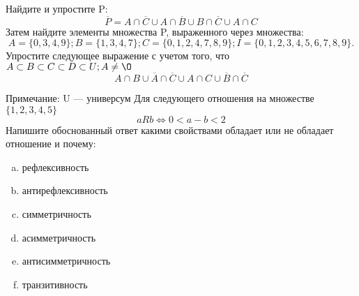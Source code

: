 \documentclass[10pt]{exam}
\begin{document}
\begin{questions}
\question
Найдите и упростите P:
\begin{equation*}
\overline{P} = A \cap \overline{C} \cup A \cap \overline{B} \cup B \cap \overline{C} \cup A \cap C
\end{equation*}
Затем найдите элементы множества P, выраженного через множества:
\begin{equation*}
A = \{0, 3, 4, 9\}; 
B = \{1, 3, 4, 7\};
C = \{0, 1, 2, 4, 7, 8, 9\};
I = \{0, 1, 2, 3, 4, 5, 6, 7, 8, 9\}.
\end{equation*}\question
Упростите следующее выражение с учетом того, что $A\subset B \subset C \subset D \subset U; A \neq \O$
\begin{equation*}
A \cap B \cup \overline{A} \cap \overline{C} \cup A \cap C \cup \overline{B} \cap \overline{C}
\end{equation*}

Примечание: U — универсум\question
Для следующего отношения на множестве $\{1, 2, 3, 4, 5\}$ 
\begin{equation*}
aRb \iff 0 < a-b<2
\end{equation*}
Напишите обоснованный ответ какими свойствами обладает или не обладает отношение и почему:   
\begin{enumerate} [a)]\setcounter{enumi}{0}
\item рефлексивность
\item антирефлексивность
\item симметричность
\item асимметричность
\item антисимметричность
\item транзитивность
\end{enumerate}


\end{questions}
\end{document}
